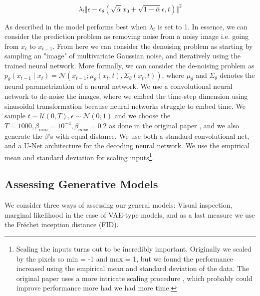 \begin{equation}
    \lambda_t\Vert \epsilon - \epsilon_\theta (\sqrt{\bar{\alpha}} x_0 + \sqrt{1-\bar{\alpha}}\epsilon, t) \Vert^2
\end{equation}

As described in \cite[p.863, eq. 25.23 and 25.24]{pml2Book} the model performs best when $\lambda_t$ is set to 1. In essence, we can consider the prediction problem as removing noise from a noisy image i.e. going from $x_t$ to $x_{t-1}$. From here we can consider the denoising problem as starting by sampling an "image" of multivariate Gaussian noise, and iteratively using the trained neural network. More formally, we can consider the de-noising problem as $p_{\theta}(x_{t-1}\mid x_t) = \mathcal{N}\left(x_{t-1} ; \mu_{\theta}(x_t, t), \Sigma_{\theta}(x_t, t)\right)$, where $\mu_\theta$ and $\Sigma_\theta$ denotes the neural parametrization of a neural network. We use a convolutional neural network to de-noise the images, where we embed the time-step dimension using sinusoidal transformation because neural networks struggle to embed time.
We sample  $t\sim \mathcal{U}(0, T), \epsilon \sim \mathcal{N}(0, 1)$ and we choose the $T=1000, \beta_{min} = 10^{-4}, \beta_{max} = 0.2$ as done in the original paper \cite{diffusion2020}, and we also generate the $\beta$'s with equal distance. We use both a standard convolutional net, and a U-Net architecture for the decoding neural network. We use the empirical mean and standard deviation for scaling inputs\footnote{Scaling the inputs turns out to be incredibly important. Originally we scaled by the pixels so min = -1 and max = 1, but we found the performance increased using the empirical mean and standard deviation of the data. The original paper uses a more intricate scaling procedure \cite{diffusion2020}, which probably could improve performance more had we had more time.}. 

\subsection*{Assessing Generative Models}

We consider three ways of assessing our general models: Visual inspection, marginal likelihood in the case of VAE-type models, and as a last measure we use the Fréchet inception distance (FID). 

